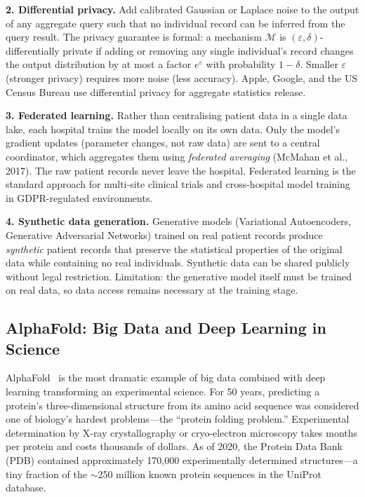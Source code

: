 \textbf{2. Differential privacy.} Add calibrated Gaussian or Laplace
noise to the output of any aggregate query such that no individual record
can be inferred from the query result. The privacy guarantee is
formal: a mechanism $\mathcal{M}$ is $(\varepsilon, \delta)$-differentially
private if adding or removing any single individual's record changes the
output distribution by at most a factor $e^\varepsilon$ with probability
$1 - \delta$. Smaller $\varepsilon$ (stronger privacy) requires more noise
(less accuracy). Apple, Google, and the US Census Bureau use differential
privacy for aggregate statistics release.

\textbf{3. Federated learning.} Rather than centralising patient data
in a single data lake, each hospital trains the model locally on its
own data. Only the model's gradient updates (parameter changes, not raw
data) are sent to a central coordinator, which aggregates them using
\emph{federated averaging} (McMahan et al., 2017). The raw patient
records never leave the hospital. Federated learning is the standard
approach for multi-site clinical trials and cross-hospital model training
in GDPR-regulated environments.

\textbf{4. Synthetic data generation.} Generative models (Variational
Autoencoders, Generative Adversarial Networks) trained on real patient
records produce \emph{synthetic} patient records that preserve the
statistical properties of the original data while containing no real
individuals. Synthetic data can be shared publicly without legal
restriction. Limitation: the generative model itself must be trained
on real data, so data access remains necessary at the training stage.

\subsection{AlphaFold: Big Data and Deep Learning in Science}
\label{subsec:alphafold}

AlphaFold~\autocite{AlphaFold2021} is the most dramatic example of
big data combined with deep learning transforming an experimental
science. For 50 years, predicting a protein's three-dimensional structure
from its amino acid sequence was considered one of biology's hardest
problems---the ``protein folding problem.'' Experimental determination
by X-ray crystallography or cryo-electron microscopy takes months per
protein and costs thousands of dollars. As of 2020, the Protein Data
Bank (PDB) contained approximately 170{,}000 experimentally determined
structures---a tiny fraction of the $\sim$250 million known protein
sequences in the UniProt database.

